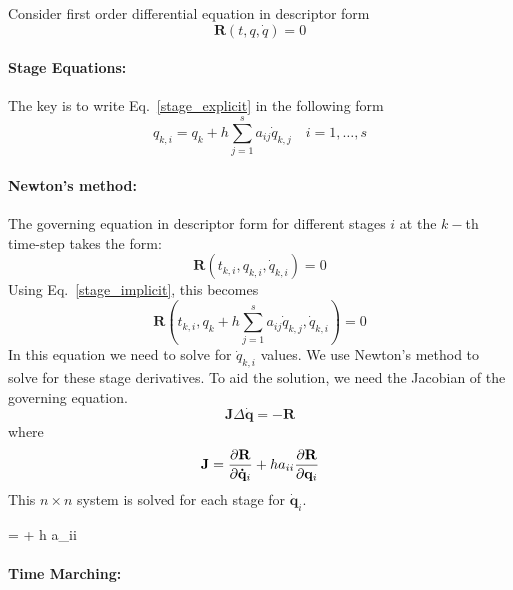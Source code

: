 \documentclass[pdftex,11pt,letter]{article}
\begin{document}
Consider first order differential equation in descriptor form
\begin{equation}
  \mathbf{R}(t, q, \dot{q}) = 0
\end{equation}

\paragraph{Stage Equations:}
The key is to write Eq.~\ref{stage_explicit} in the following form
\begin{equation}\label{stage_implicit}
  q_{k,i} = q_{k} + h \sum_{j=1}^s a_{ij} \dot{q}_{k,j} \quad i = 1,\ldots,s 
\end{equation}

\paragraph{Newton's method:}

The governing equation in descriptor form for different stages $i$ at the $k-$th time-step takes the form:
\begin{equation}
  \mathbf{R}\left(t_{k,i}, q_{k,i}, \dot{q}_{k,i}\right) = 0
\end{equation}
Using Eq.~\eqref{stage_implicit}, this becomes
\begin{equation}
  \mathbf{R}\left(t_{k,i}, q_k + h \sum_{j=1}^s a_{ij}\dot{q}_{k,j}, \dot{q}_{k,i}\right) = 0
\end{equation}
In this equation we need to solve for $\dot{q}_{k,i}$ values. We use
Newton's method to solve for these stage derivatives. To aid the
solution, we need the Jacobian of the governing equation.
\begin{equation}
 \mathbf{J} \Delta\mathbf{\dot{q}} = -\mathbf{R}
\end{equation}
where
\begin{equation}
  \mathbf{J} = \dfrac{\partial \mathbf{R}}{\partial \mathbf{\dot{q}}_{i}} + h a_{ii} \dfrac{\partial \mathbf{R}}{\partial \mathbf{q}_{i}}
\end{equation}
This $n \times n$  system is solved for each stage for $\mathbf{\dot{q}}_i$.

\beq
{} =  + h a_{ii} 
\eeq
  

\paragraph{Time Marching:}
\end{document}

